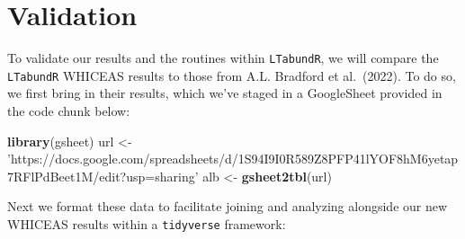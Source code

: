 \documentclass[
]{book}
\newenvironment{Shaded}{\begin{snugshade}}{\end{snugshade}}
\newcommand{\KeywordTok}[1]{\textcolor[rgb]{0.13,0.29,0.53}{\textbf{#1}}}
\newcommand{\NormalTok}[1]{#1}
\newcommand{\StringTok}[1]{\textcolor[rgb]{0.31,0.60,0.02}{#1}}
\begin{document}
\hypertarget{validation-1}{%
\section*{Validation}\label{validation-1}}

To validate our results and the routines within \texttt{LTabundR}, we will compare the \texttt{LTabundR} WHICEAS results to those from A.L. Bradford et al.~(2022). To do so, we first bring in their results, which we've staged in a GoogleSheet provided in the code chunk below:

\begin{Shaded}
\begin{Highlighting}[]
\KeywordTok{library}\NormalTok{(gsheet)}
\NormalTok{url <-}\StringTok{ 'https://docs.google.com/spreadsheets/d/1S94I9I0R589Z8PFP41lYOF8hM6yetap7RFlPdBeet1M/edit?usp=sharing'}
\NormalTok{alb <-}\StringTok{ }\KeywordTok{gsheet2tbl}\NormalTok{(url)}
\end{Highlighting}
\end{Shaded}

Next we format these data to facilitate joining and analyzing alongside our new WHICEAS results within a \texttt{tidyverse} framework:
\end{document}
